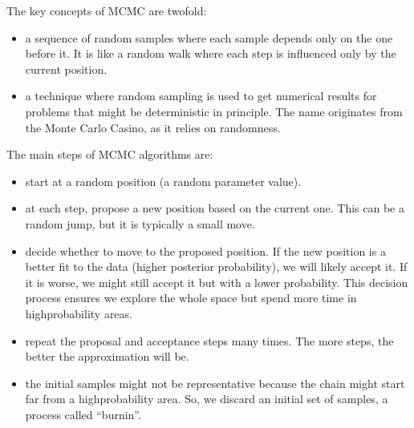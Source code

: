 \documentclass[letterpaper,10pt,english]{jupyterBook}
\begin{document}
\sphinxAtStartPar
The key concepts of MCMC are two\sphinxhyphen{}fold:
\begin{itemize}
\item {} 
\sphinxAtStartPar
{} a sequence of random samples where each sample depends only on the one before it. It is like a random walk where each step is influenced only by the current position.

\item {} 
\sphinxAtStartPar
{} a technique where random sampling is used to get numerical results for problems that might be deterministic in principle. The name originates from the Monte Carlo Casino, as it relies on randomness.

\end{itemize}

\sphinxAtStartPar
The main steps of MCMC algorithms are:
\begin{itemize}
\item {} 
\sphinxAtStartPar
{} start at a random position (a random parameter value).

\item {} 
\sphinxAtStartPar
{} at each step, propose a new position based on the current one. This can be a random jump, but it is typically a small move.

\item {} 
\sphinxAtStartPar
{} decide whether to move to the proposed position. If the new position is a better fit to the data (higher posterior probability), we will likely accept it. If it is worse, we might still accept it but with a lower probability. This decision process ensures we explore the whole space but spend more time in high\sphinxhyphen{}probability areas.

\item {} 
\sphinxAtStartPar
{} repeat the proposal and acceptance steps many times. The more steps, the better the approximation will be.

\item {} 
\sphinxAtStartPar
{} the initial samples might not be representative because the chain might start far from a high\sphinxhyphen{}probability area. So, we discard an initial set of samples, a process called “burn\sphinxhyphen{}in”.

\end{itemize}
\end{document}
